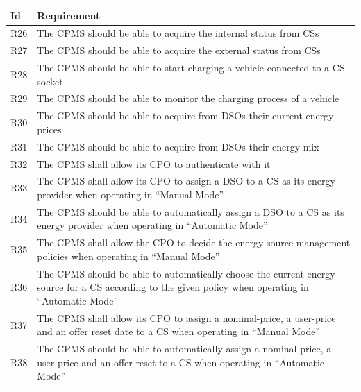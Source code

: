 \documentclass[11pt]{article}
\begin{document}
\begin{table}[H]
    \centering
    \setlength{\tabcolsep}{18pt}
    \renewcommand{\arraystretch}{1.2}
    \begin{tabularx}{\textwidth}{|>{\centering\hsize=0.1\hsize}X|>{\hsize=1.9\hsize}X|}
        \hline
        \textbf{Id} & \textbf{Requirement} \\
        \hline
        R26 & The CPMS should be able to acquire the internal status from CSs \\
        \hline
        R27 & The CPMS should be able to acquire the external status from CSs \\
        \hline
        R28 & The CPMS should be able to start charging a vehicle connected to a CS socket \\
        \hline
        R29 & The CPMS should be able to monitor the charging process of a vehicle \\
        \hline
        R30 & The CPMS should be able to acquire from DSOs their current energy prices \\
        \hline
        R31 & The CPMS should be able to acquire from DSOs their energy mix \\
        \hline
        R32 & The CPMS shall allow its CPO to authenticate with it \\
        \hline
        R33 & The CPMS shall allow its CPO to assign a DSO to a CS as its energy provider  when operating in “Manual Mode” \\
        \hline
        R34 & The CPMS should be able to automatically assign a DSO to a CS as its energy provider when operating in “Automatic Mode” \\
        \hline
        R35 & The CPMS shall allow the CPO to decide the energy source management policies when operating in “Manual Mode” \\
        \hline
        R36 & The CPMS should be able to automatically choose the current energy source for a CS according to the given policy when operating in “Automatic Mode” \\
        \hline
        R37 & The CPMS shall allow its CPO to assign a nominal-price, a user-price and an offer reset date to a CS when operating in “Manual Mode” \\
        \hline
        R38 & The CPMS should be able to automatically assign a nominal-price, a user-price and an offer reset to a CS when operating in “Automatic Mode” \\

\end{tabularx}
\end{table}
\end{document}
